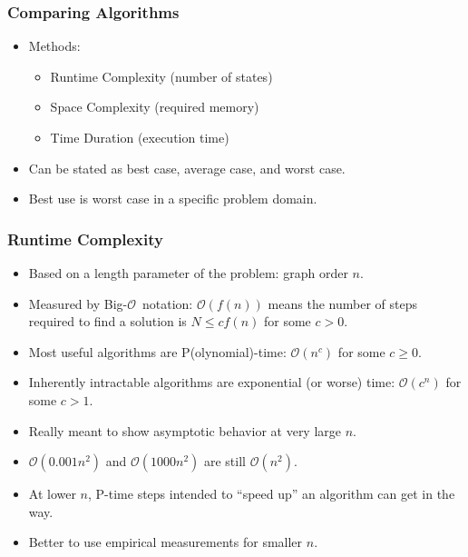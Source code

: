 \documentclass{beamer}
\newcommand{\BO}{\mathcal{O}}
\newcommand{\BigO}{Big-\(\mathcal{O}\)}
\begin{document}
\begin{frame}
  \frametitle{Comparing Algorithms}
  \begin{itemize}
  \item Methods:
    \begin{itemize}
    \item Runtime Complexity (number of states)
    \item Space Complexity (required memory)
    \item Time Duration (execution time)
    \end{itemize}
  \item Can be stated as best case, average case, and worst case.
  \item Best use is worst case in a specific problem domain.
  \end{itemize}
\end{frame}

\begin{frame}
  \frametitle{Runtime Complexity}
  \begin{itemize}
  \item Based on a length parameter of the problem: graph order \(n\).
  \item Measured by \BigO\ notation: \(\BO(f(n))\) means the number of steps required to find a solution is
    \(N\le cf(n)\) for some \(c>0\).
  \item Most useful algorithms are P(olynomial)-time: \(\BO(n^c)\) for some \(c\ge0\).
  \item Inherently intractable algorithms are exponential (or worse) time: \(\BO(c^n)\) for some \(c>1\).
  \item Really meant to show asymptotic behavior at very large \(n\).
  \item \(\BO(0.001n^2)\) and \(\BO(1000n^2)\) are still \(\BO(n^2)\).
  \item At lower \(n\), P-time steps intended to ``speed up'' an algorithm can get in the way.
  \item Better to use empirical measurements for smaller \(n\).
  \end{itemize}
\end{frame}
\end{document}
